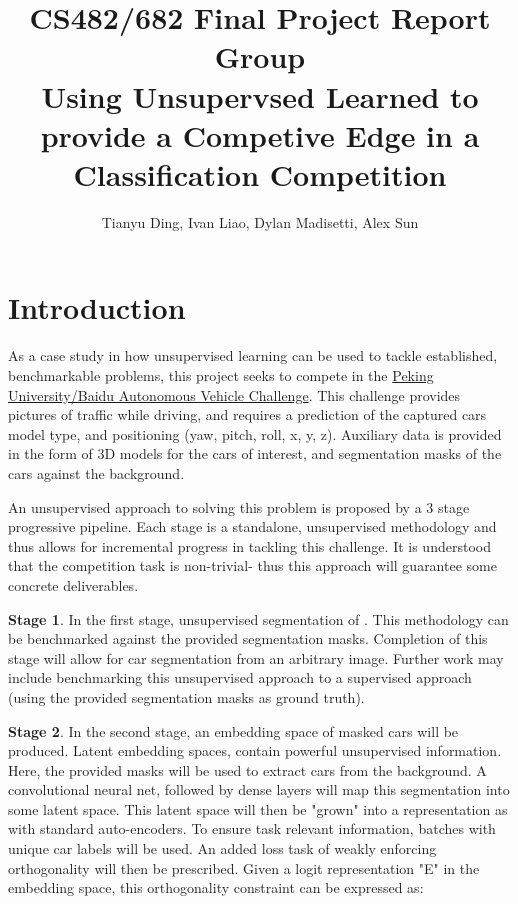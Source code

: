 \documentclass[twocolumn]{article}
\title{CS482/682 Final Project Report Group \todo{XX}\\
  \large Using Unsupervsed Learned to provide a Competive Edge in a Classification
Competition}
\author{Tianyu Ding, Ivan Liao, Dylan Madisetti, Alex Sun}
\date{}
\begin{document}
  \maketitle

  \section{Introduction}

  As a case study in how unsupervised learning can be used to tackle
  established, benchmarkable problems, this project seeks to compete in the
  \href{https://www.kaggle.com/c/pku-autonomous-driving}{Peking University/Baidu
  Autonomous Vehicle Challenge}. This challenge provides pictures of traffic
  while driving, and requires a prediction of the captured cars model type, and
  positioning (yaw, pitch, roll, x, y, z). Auxiliary data is provided in the
  form of 3D models for the cars of interest, and segmentation masks of the cars
  against the background.

  An unsupervised approach to solving this problem is proposed by a 3 stage
  progressive pipeline. Each stage is a standalone, unsupervised methodology and
  thus allows for incremental progress in tackling this challenge. It is
  understood that the competition task is non-trivial- thus this approach will
  guarantee some concrete deliverables.

  \textbf{Stage 1}. In the first stage, unsupervised segmentation of . This
  methodology can be benchmarked against the provided segmentation masks.
  Completion of this stage will allow for car segmentation from an arbitrary
  image. Further work may include benchmarking this unsupervised approach to a
  supervised approach (using the provided segmentation masks as ground truth).

  \textbf{Stage 2}. In the second stage, an embedding space of masked cars will
  be produced. Latent embedding spaces, contain powerful unsupervised
  information. Here, the provided masks will be used to extract cars from the
  background. A convolutional neural net, followed by dense layers will map this
  segmentation into some latent space. This latent space will then be "grown"
  into a representation as with standard auto-encoders. To ensure task relevant
  information, batches with unique car labels will be used. An added loss task
  of weakly enforcing orthogonality will then be prescribed. Given a logit
  representation "E" in the embedding space, this orthogonality constraint can be
  expressed as:
\end{document}
